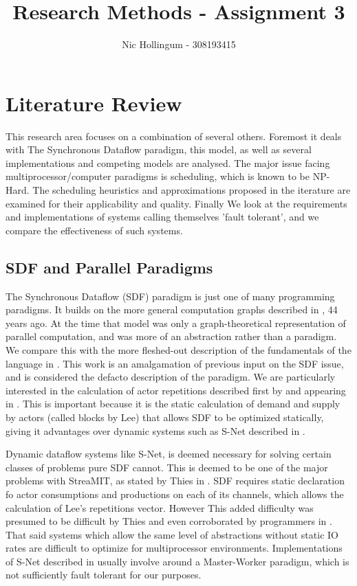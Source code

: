 
\author{Nic Hollingum - 308193415}
\title{Research Methods - Assignment 3}



\maketitle

\section*{Literature Review}

This research area focuses on a combination of several others.
Foremost it deals with The Synchronous Dataflow paradigm, this model, as well as several implementations and competing models are analysed.
The major issue facing multiprocessor/computer paradigms is scheduling, which is known to be NP-Hard.
The scheduling heuristics and approximations proposed in the iterature are examined for their applicability and quality.
Finally We look at the requirements and implementations of systems calling themselves 'fault tolerant', and we compare the effectiveness of such systems.

\subsection*{SDF and Parallel Paradigms}

The Synchronous Dataflow (SDF) paradigm is just one of many programming paradigms.
It builds on the more general computation graphs described in \cite{kar66}, 44 years ago.
At the time that model was only a graph-theoretical representation of parallel computation, and was more of an abstraction rather than a paradigm.
We compare this with the more fleshed-out description of the fundamentals of the language in \cite{sdfBook}.
This work is an amalgamation of previous input on the SDF issue, and is considered the defacto description of the paradigm.
We are particularly interested in the calculation of actor repetitions described first by \cite{lee87} and appearing in \cite{sdfBook}.
This is important because it is the static calculation of demand and supply by actors (called blocks by Lee) that allows SDF to be optimized statically, giving it advantages over dynamic systems such as S-Net described in \cite{pen09}.

Dynamic dataflow systems like S-Net, is deemed necessary for solving certain classes of problems pure SDF cannot.
This is deemed to be one of the major problems with StreaMIT, as stated by Thies in \cite{thies02}.
SDF requires static declaration fo actor consumptions and productions on each of its channels, which allows the calculation of Lee's repetitions vector.
However This added difficulty was presumed to be difficult by Thies and even corroborated by programmers in \cite{thies10}.
That said systems which allow the same level of abstractions without static IO rates are difficult to optimize for multiprocessor environments.
Implementations of S-Net described in \cite{pen09} usually involve around a Master-Worker paradigm, which is not sufficiently fault tolerant for our purposes.

